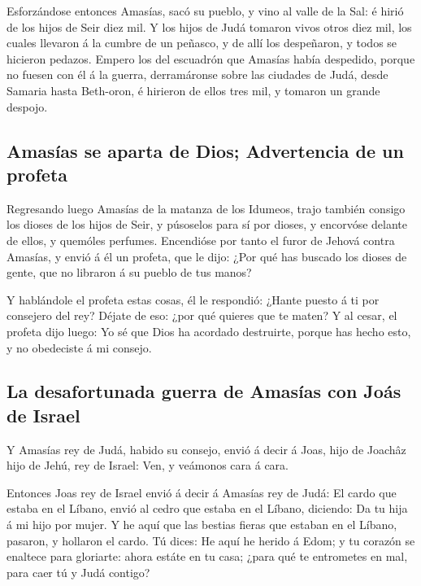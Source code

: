  Esforzándose entonces Amasías, sacó su pueblo, y vino al
valle de la Sal: é hirió de los hijos de Seir diez mil. 
Y los hijos de Judá tomaron vivos otros diez mil, los cuales llevaron á
la cumbre de un peñasco, y de allí los despeñaron, y todos se hicieron
pedazos.  Empero los del escuadrón que Amasías había
despedido, porque no fuesen con él á la guerra, derramáronse sobre las
ciudades de Judá, desde Samaria hasta Beth-oron, é hirieron de ellos
tres mil, y tomaron un grande despojo.

\hypertarget{amasuxedas-se-aparta-de-dios-advertencia-de-un-profeta}{%
\subsection{Amasías se aparta de Dios; Advertencia de un
profeta}\label{amasuxedas-se-aparta-de-dios-advertencia-de-un-profeta}}

 Regresando luego Amasías de la matanza de los Idumeos,
trajo también consigo los dioses de los hijos de Seir, y púsoselos para
sí por dioses, y encorvóse delante de ellos, y quemóles perfumes.
 Encendióse por tanto el furor de Jehová contra Amasías,
y envió á él un profeta, que le dijo: ¿Por qué has buscado los dioses de
gente, que no libraron á su pueblo de tus manos?

 Y hablándole el profeta estas cosas, él le respondió:
¿Hante puesto á ti por consejero del rey? Déjate de eso: ¿por qué
quieres que te maten? Y al cesar, el profeta dijo luego: Yo sé que Dios
ha acordado destruirte, porque has hecho esto, y no obedeciste á mi
consejo.

\hypertarget{la-desafortunada-guerra-de-amasuxedas-con-jouxe1s-de-israel}{%
\subsection{La desafortunada guerra de Amasías con Joás de
Israel}\label{la-desafortunada-guerra-de-amasuxedas-con-jouxe1s-de-israel}}

 Y Amasías rey de Judá, habido su consejo, envió á decir
á Joas, hijo de Joachâz hijo de Jehú, rey de Israel: Ven, y veámonos
cara á cara.

 Entonces Joas rey de Israel envió á decir á Amasías rey
de Judá: El cardo que estaba en el Líbano, envió al cedro que estaba en
el Líbano, diciendo: Da tu hija á mi hijo por mujer. Y he aquí que las
bestias fieras que estaban en el Líbano, pasaron, y hollaron el cardo.
 Tú dices: He aquí he herido á Edom; y tu corazón se
enaltece para gloriarte: ahora estáte en tu casa; ¿para qué te
entrometes en mal, para caer tú y Judá contigo?

